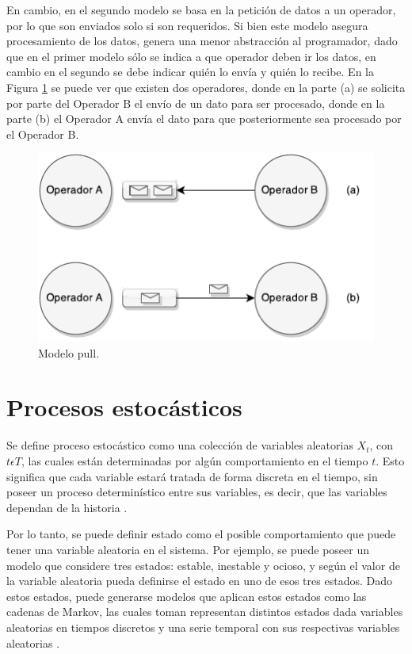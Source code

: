 En cambio, en el segundo modelo se basa en la petición de datos a un operador, por lo que son enviados solo si son requeridos. Si bien este modelo asegura procesamiento de los datos, genera una menor abstracción al programador, dado que en el primer modelo sólo se indica a que operador deben ir los datos, en cambio en el segundo se debe indicar quién lo envía y quién lo recibe. En la Figura \ref{fig:sps-pull} se puede ver que existen dos operadores, donde en la parte (a) se solicita por parte del Operador B el envío de un dato para ser procesado, donde en la parte (b) el Operador A envía el dato para que posteriormente sea procesado por el Operador B.

\begin{figure}[ht!]
  \centering
    \includegraphics[scale=1]{images/SPS-Pull.pdf}
  \caption{Modelo pull.}
  \label{fig:sps-pull}
\end{figure}

\section{Procesos estocásticos}
Se define proceso estocástico como una colección de variables aleatorias {$X_t$, con $t \epsilon T$}, las cuales están determinadas por algún comportamiento en el tiempo $t$. Esto significa que cada variable estará tratada de forma discreta en el tiempo, sin poseer un proceso determinístico entre sus variables, es decir, que las variables dependan de la historia \citep{pinsky2010introduction}.

Por lo tanto, se puede definir estado como el posible comportamiento que puede tener una variable aleatoria en el sistema. Por ejemplo, se puede poseer un modelo que considere tres estados: estable, inestable y ocioso, y según el valor de la variable aleatoria pueda definirse el estado en uno de esos tres estados. Dado estos estados, puede generarse modelos que aplican estos estados como las cadenas de Markov, las cuales toman representan distintos estados dada variables aleatorias en tiempos discretos y una serie temporal con sus respectivas variables aleatorias \citep{de1978calculus}.

